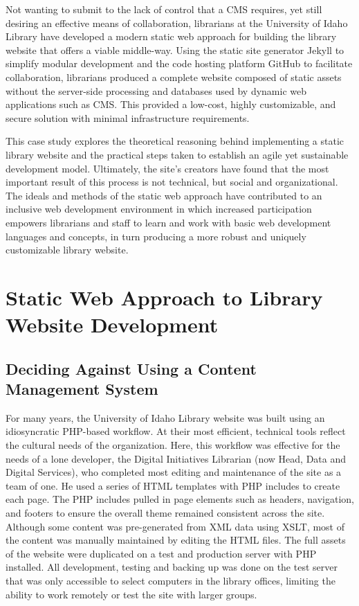 \documentclass{book}
\begin{document}
Not wanting to submit to the lack of control that a CMS requires, yet still
desiring an effective means of collaboration, librarians at the University of
Idaho Library have developed a modern static web approach for building the
library website that offers a viable middle-way. Using the static site
generator Jekyll to simplify modular development and the code hosting platform
GitHub to facilitate collaboration, librarians produced a complete website
composed of static assets without the server-side processing and databases
used by dynamic web applications such as CMS. This provided a low-cost, highly
customizable, and secure solution with minimal infrastructure requirements.

This case study explores the theoretical reasoning behind implementing a
static library website and the practical steps taken to establish an agile yet
sustainable development model. Ultimately, the site's creators have found that
the most important result of this process is not technical, but social and
organizational. The ideals and methods of the static web approach have
contributed to an inclusive web development environment in which increased
participation empowers librarians and staff to learn and work with basic web
development languages and concepts, in turn producing a more robust and
uniquely customizable library website.

\hypertarget{static-web-approach-to-library-website-development}{%
\chapter{Static Web Approach to Library Website
Development}\label{static-web-approach-to-library-website-development}}

\hypertarget{deciding-against-using-a-content-management-system}{%
\section{Deciding Against Using a Content Management
System}\label{deciding-against-using-a-content-management-system}}

For many years, the University of Idaho Library website was built using an
idiosyncratic PHP-based workflow. At their most efficient, technical tools
reflect the cultural needs of the organization. Here, this workflow was
effective for the needs of a lone developer, the Digital Initiatives Librarian
(now Head, Data and Digital Services), who completed most editing and
maintenance of the site as a team of one. He used a series of HTML templates
with PHP includes to create each page. The PHP includes pulled in page
elements such as headers, navigation, and footers to ensure the overall theme
remained consistent across the site. Although some content was pre-generated
from XML data using XSLT, most of the content was manually maintained by
editing the HTML files. The full assets of the website were duplicated on a
test and production server with PHP installed. All development, testing and
backing up was done on the test server that was only accessible to select
computers in the library offices, limiting the ability to work remotely or
test the site with larger groups.
\end{document}
